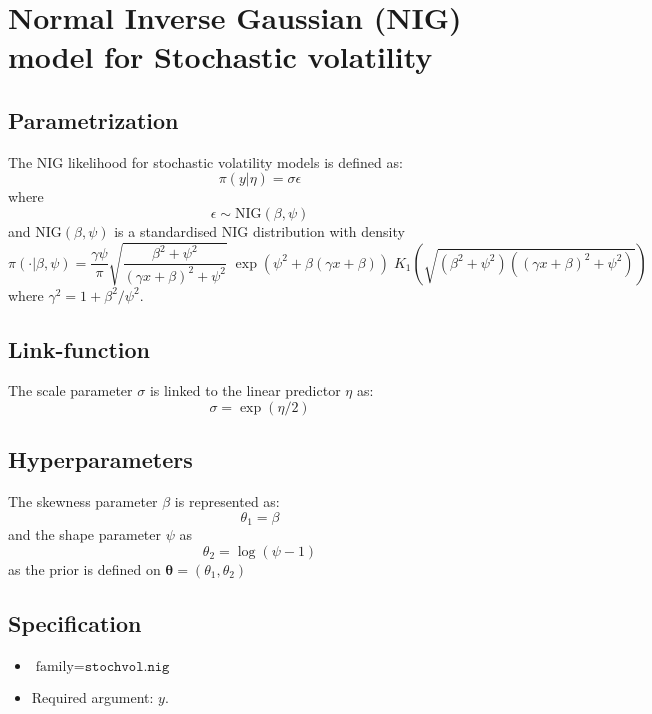 \documentclass[a4paper,11pt]{article}
\begin{document}
\section*{ Normal Inverse Gaussian (NIG) model for Stochastic
    volatility}

\subsection*{Parametrization}

The NIG likelihood for stochastic volatility models is defined as:
\[
\pi(y |\eta )=\sigma \epsilon
\]
where
\[
\epsilon \sim\mbox{NIG}(\beta,\psi)
\]
and $\mbox{NIG}(\beta,\psi)$ is a standardised NIG distribution with
density
\begin{displaymath}
    \pi(\cdot|\beta,\psi)=\frac{\gamma\psi}{\pi} \sqrt{ \frac{\beta^{2} +
            \psi^{2}}{(\gamma x + \beta)^{2} + \psi^{2}}}
    \;
    \exp\left(\psi^{2} + \beta(\gamma x + \beta)\right)
    \;
    K_{1}\left(\sqrt{ \left(\beta^{2}+\psi^{2}\right)\left((\gamma x
            + \beta)^{2}+\psi^{2}\right)}\right)
\end{displaymath}
where $\gamma^{2} = 1 + \beta^{2}/\psi^{2}$.


\subsection*{Link-function}

The scale parameter $\sigma $ is linked to the linear predictor $\eta
$ as:
\[
\sigma =\exp(\eta /2)
\]


\subsection*{Hyperparameters}

The skewness parameter $\beta$ is represented as:
\[
\theta_1 = \beta
\]
and the shape parameter $\psi$ as
\[
\theta_2 = \log(\psi-1)
\]
as the prior is defined on $\mathbf{\theta}=(\theta_1,\theta_2)$

\subsection*{Specification}

\begin{itemize}
\item $\text{family}=\texttt{stochvol.nig}$
\item Required argument: $y$.
\end{itemize}
\end{document}
